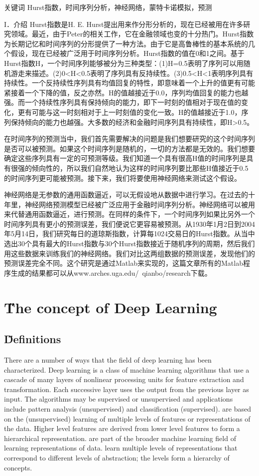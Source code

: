 \documentclass[12pt]{article}
\begin{document}
关键词
Hurst指数，时间序列分析，神经网络，蒙特卡诺模拟，预测


I．介绍
Hurst指数是H. E. Hurst提出用来作分形分析的，现在已经被用在许多研究领域。最近，由于Peter的相关工作，它在金融领域也变的十分热门。Hurst指数为长期记忆和时间序列的分形提供了一种方法。由于它是高鲁棒性的基本系统的几个假设，现在已经被广泛用于时间序列分析。Hurst指数的值在0和1之间。基于Hurst指数H，一个时间序列能够被分为三种类型：(1)H=0.5表明了序列可以用随机游走来描述。(2)0<H<0.5表明了序列具有反持续性。(3)0.5<H<1表明序列具有持续性。一个反持续性序列具有均值回复的特性，即意味着一个上升的值更有可能紧接着一个下降的值，反之亦然。H的值越接近于0.0，序列均值回复的能力也越强。而一个持续性序列具有保持倾向的能力，即下一时刻的值相对于现在值的变化，更有可能与这一时刻相对于上一时刻值的变化一致。H的值越接近于1.0，序列保持倾向的能力也越强。大多数的经济和金融时间序列具有持续性，即H>0.5。

在时间序列的预测当中，我们首先需要解决的问题是我们想要研究的这个时间序列是否可以被预测。如果这个时间序列是随机的，一切的方法都是无效的。我们想要确定这些序列具有一定的可预测等级。我们知道一个具有很高H值的时间序列是具有很强的倾向性的，所以我们自然地认为这样的时间序列要比那些H值接近于0.5的时间序列更可能被预测。接下来，我们将要使用神经网络来测试这个假设。

神经网络是无参数的通用函数逼近，可以无假设地从数据中进行学习。在过去的十年里，神经网络预测模型已经被广泛应用于金融时间序列分析。神经网络可以被用来代替通用函数逼近，进行预测。在同样的条件下，一个时间序列如果比另外一个时间序列具有更小的预测误差，我们便说它更容易被预测。从1930年1月2日到2004年5月14日，我们研究每日的道琼斯指数，计算每1024交易日的Hurst指数。从当中选出30个具有最大的Hurst指数与30个Hurst指数接近于随机序列的周期，然后我们用这些数据来训练我们的神经网络。我们对比这两组数据的预测误差，发现他们的预测误差完全不同。这个研究是通过Matlab来实现的，这篇文章所有的Matlab程序生成的结果都可以从www.arches.uga.edu/~qianbo/research下载。

\section{\H The concept of Deep Learning}
\subsection{\H Definitions}
There are a number of ways that the field of deep learning has been characterized. Deep learning is a class of machine learning algorithms that use a cascade of many layers of nonlinear processing units for feature extraction and transformation. Each successive layer uses the output from the previous layer as input. The algorithms may be supervised or unsupervised and applications include pattern analysis (unsupervised) and classification (supervised).
are based on the (unsupervised) learning of multiple levels of features or representations of the data. Higher level features are derived from lower level features to form a hierarchical representation.
are part of the broader machine learning field of learning representations of data.
learn multiple levels of representations that correspond to different levels of abstraction; the levels form a hierarchy of concepts.
\end{document}
